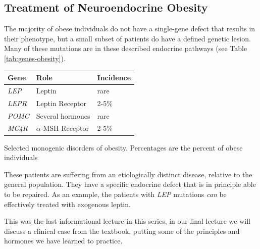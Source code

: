 \documentclass{tufte-handout}
\begin{document}
\subsection{Treatment of Neuroendocrine Obesity}

The majority of obese individuals do not have a single-gene defect that results in their phenotype, but a small subset of patients do have a defined genetic lesion.  Many of these mutations are in these described endocrine pathways (see Table \ref{tab:genes-obesity}).

\begin{margintable}[+1cm]
  \centering
  \begin{tabular}{lll}
    \toprule
    Gene & Role & Incidence \\
    \midrule
    \textit{LEP} & Leptin & rare \\
    \textit{LEPR} & Leptin Receptor & 2-5\% \\
    \textit{POMC} & Several hormones & rare \\
    \textit{MC4R} & $\alpha$-MSH Receptor & 2-5\% \\
    \bottomrule
  \end{tabular}
  \caption{Selected monogenic disorders of obesity.  Percentages are the percent of obese individuals}
  \label{tab:genes-obesity}
\end{margintable}

These patients are suffering from an etiologically distinct disease, relative to the general population.  They have a specific endocrine defect that is in principle able to be repaired.  As an example, the patients with \textit{LEP} mutations \emph{can} be effectively treated with exogenous leptin\cite{Farooqi1999}.

This was the last informational lecture in this series, in our final lecture we will discuss a clinical case from the textbook, putting some of the principles and hormones we have learned to practice.

\listoffigures
\listoftables



\end{document}
